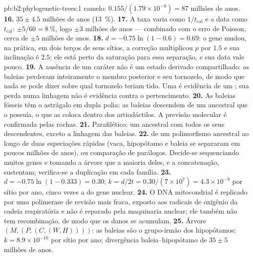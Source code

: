\begin{solution}{pb:b2:phylogenetic-trees:1}
camelo: $0.155/(1.79\times 10^{-9}) = 87$ milhões de anos.
\textbf{16.} $35 \pm 4.5$ milhões de anos (\qty{13}{\%}).
\textbf{17.} A taxa varia como $1/t_{\text{cal}}$ e a data como
$t_{\text{cal}}$: $\pm 5/60 = \qty{8}{\%}$, logo $\pm 3$ milhões de anos
--- combinado com o erro de Poisson, cerca de $\pm 5$ milhões de anos.
\textbf{18.} $d = -0.75\ln(1 - 0.6) = 0.69$: o gene mudou, na prática,
em dois terços de seus sítios, a correção multiplicou
$p$ por $1.5$ e sua inclinação é $2.5$; ele está perto da saturação para
essa separação, e sua data vale pouco.
\textbf{19.} A ausência de um caráter não é um estado derivado
compartilhado: as baleias perderam inteiramente o membro posterior e seu
tornozelo, de modo que nada se pode dizer sobre qual tornozelo teriam
tido. Uma  é evidência de um ; sua perda numa linhagem
não é evidência contra o pertencimento.
\textbf{20.} As baleias fósseis têm o astrágalo em dupla polia: as
baleias descendem de um ancestral que o possuía, o que as coloca dentro
dos artiodáctilos. A previsão molecular é confirmada pelas
rochas.
\textbf{21.} Parafilético: um ancestral com todos os seus descendentes,
exceto a linhagem das baleias.
\textbf{22.}  de um polimorfismo
ancestral ao longo de duas especiações rápidas (vaca, hipopótamo e baleia
se separaram em poucos milhões de anos), ou comparação de parálogos.
Decide-se sequenciando muitos genes e tomando a árvore que a maioria
deles, e a concatenação, sustentam; verifica-se a duplicação em cada
família.
\textbf{23.} $d = -0.75\ln(1 - 0.333) = 0.30$; $k = d/2t =
0.30/(7\times 10^{7}) = 4.3\times 10^{-9}$ por sítio por ano, cinco
vezes a do gene nuclear.
\textbf{24.} O DNA mitocondrial é replicado por uma polimerase de
revisão mais fraca, exposto aos radicais de oxigênio da cadeia
respiratória e não é reparado pela maquinaria nuclear; ele também não
tem recombinação, de modo que os danos se acumulam.
\textbf{25.} Árvore $(M,(P,(C,(W,H))))$: as baleias são o grupo-irmão
dos hipopótamos; $k = 8.9\times 10^{-10}$ por sítio por ano; divergência
baleia--hipopótamo de $35 \pm 5$ milhões de anos.
\end{solution}
